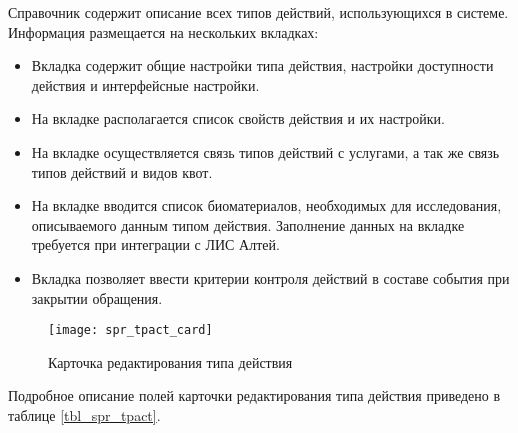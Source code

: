 Справочник содержит описание всех типов действий, использующихся в системе. Информация размещается на нескольких вкладках:
\begin{itemize}
 \item Вкладка  содержит общие настройки типа действия, настройки доступности действия и интерфейсные настройки.
 \item На вкладке  располагается список свойств действия и их настройки.
 \item На вкладке  осуществляется связь типов действий с услугами, а так же связь типов действий и видов квот.
 \item На вкладке  вводится список биоматериалов, необходимых для исследования, описываемого данным типом действия. Заполнение данных на вкладке требуется при интеграции с ЛИС Алтей.
 \item Вкладка  позволяет ввести критерии контроля действий в составе события при закрытии обращения.
\end{itemize}

\begin{figure}[ht]\centering
 \texttt{[image: spr\_tpact\_card]}
 \caption{Карточка редактирования типа действия}
 \label{img_spr_tpact_card}
\end{figure}

Подробное описание полей карточки редактирования типа действия приведено в таблице \ref{tbl_spr_tpact}.

